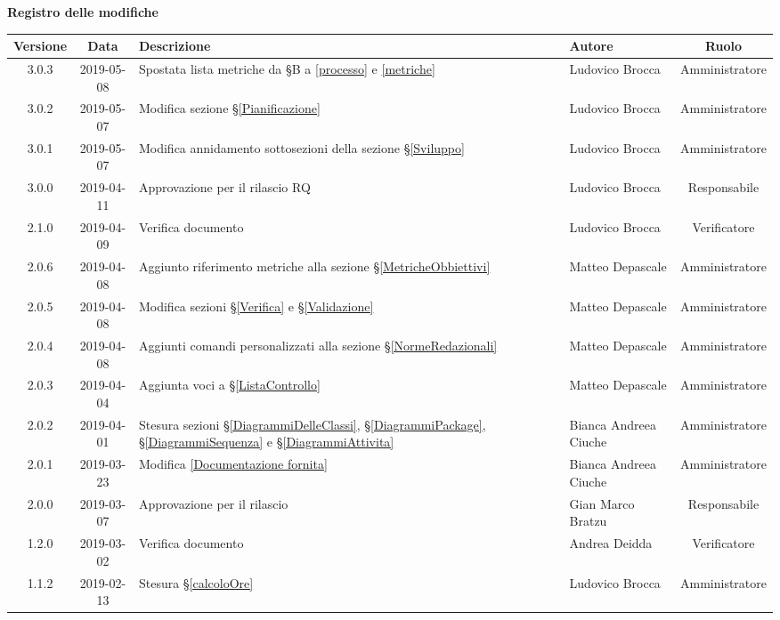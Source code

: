 \begin{center}
	\textbf{Registro delle modifiche}
	\end{center}
	\begin{center}
		\begin{tabularx}{\textwidth}{|c|c|X|X|c|}
			\hline
			\textbf{Versione} & \textbf{Data} & \textbf{Descrizione} & \textbf{Autore} & \textbf{Ruolo} \\ 
			\hline
			3.0.3 & 2019-05-08 & Spostata lista metriche da \S B a \ref{processo} e \ref{metriche} & Ludovico Brocca & Amministratore \\ 
			\hline
			3.0.2 & 2019-05-07 & Modifica sezione \S\ref{Pianificazione} & Ludovico Brocca & Amministratore \\
			\hline
			3.0.1 & 2019-05-07 & Modifica annidamento sottosezioni della sezione \S\ref{Sviluppo} & Ludovico Brocca & Amministratore \\
			\hline
			3.0.0 & 2019-04-11 & Approvazione per il rilascio RQ & Ludovico Brocca & Responsabile \\
			\hline
			2.1.0 & 2019-04-09 & Verifica documento & Ludovico Brocca & Verificatore \\
			\hline
			2.0.6 & 2019-04-08 & Aggiunto riferimento metriche alla sezione \S\ref{MetricheObbiettivi} &Matteo Depascale & Amministratore \\
			\hline 
			2.0.5 & 2019-04-08 & Modifica sezioni \S\ref{Verifica}  e \S\ref{Validazione} & Matteo Depascale & Amministratore \\
			\hline
			2.0.4 & 2019-04-08 & Aggiunti comandi personalizzati alla sezione \S\ref{NormeRedazionali} &Matteo Depascale & Amministratore \\
			\hline
			2.0.3 & 2019-04-04 & Aggiunta voci a \S\ref{ListaControllo} & Matteo Depascale & Amministratore \\
			\hline
			2.0.2 & 2019-04-01 & Stesura sezioni \S\ref{DiagrammiDelleClassi}, \S\ref{DiagrammiPackage}, \S\ref{DiagrammiSequenza} e \S\ref{DiagrammiAttivita}  & Bianca Andreea Ciuche & Amministratore \\
			\hline
			2.0.1 & 2019-03-23 & Modifica \ref{Documentazione fornita} & Bianca Andreea Ciuche & Amministratore \\
			\hline
			2.0.0 &2019-03-07 & Approvazione per il rilascio & Gian Marco Bratzu& Responsabile\\
			\hline
			1.2.0 &2019-03-02 & Verifica documento &Andrea Deidda& Verificatore\\
			\hline
			1.1.2 &2019-02-13 &Stesura \S\ref{calcoloOre} &Ludovico Brocca& Amministratore\\

\end{tabularx}
\end{center}

